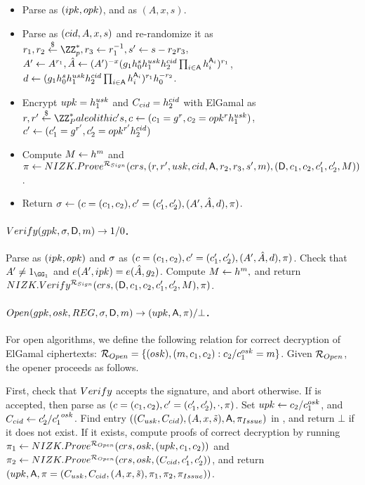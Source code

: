 \begin{itemize}
\item Parse \gpk as $(ipk,opk)$, and \cred as $(A,x,s)$.
\item Parse \cred as $(cid,A,x,s)$ and re-randomize it as $r_1,r_2 \getr
  \ZZ^*_p, r_3 \gets r_1^{-1}, s' \gets s - r_2r_3$, $A' \gets A^{r_1},
  \hat{A} \gets (A')^{-x}(g_1h_0^sh_1^{usk}h_2^{cid}
  \prod_{i \in \mathsf{A}}h_i^{\mathsf{A}_i})^{r_1}$,
  $d \gets (g_1h_0^sh_1^{usk}h_2^{cid}
  \prod_{i \in \mathsf{A}}h_i^{\mathsf{A}_i})^{r_1}h_0^{-r_2}$.
\item Encrypt $upk=h_1^{usk}$ and $C_{cid}=h_2^{cid}$
  with ElGamal as $r,r' \getr \ZZ^*_Paleolithic's,
  c \gets (c_1 = \gen{g}^r,c_2 = \opk^r\gen{h}_1^{\usk})$,
  $c' \gets (c'_1 = g^{r'},c'_2 = opk^{r'}h_2^{cid})$
\item Compute $M \gets h^m$ and
  $\pi \gets NIZK.Prove^{\mathcal{R}_{Sign}}(crs,
  (r,r',usk,cid,\mathsf{A},r_2,r_3,s',m), (\mathsf{D},c_1,c_2,c'_1,c'_2,M))$.
\item Return $\sigma \gets (c=(c_1,c_2),c'=(c'_1,c'_2),(A',\hat{A},d),\pi)$.
\end{itemize}

\paragraph{$Verify(gpk,\sigma,\mathsf{D},m) \rightarrow 1/0$.} %
Parse \gpk as $(ipk,opk)$ and $\sigma$ as $(c=(c_1,c_2),c'=(c'_1,c'_2),
(A',\hat{A},d), \pi)$. Check that $A' \neq 1_{\GG_1}$ and $e(A',ipk) =
e(\hat{A},g_2)$. Compute $M \gets h^m,$ and return
$NIZK.Verify^{\mathcal{R}_{Sign}}(crs,(\mathsf{D},c_1,c_2,c'_1,c'_2,M),
\pi)$.

\paragraph{$\Open(\gpk,\osk,\trans,\sig,\DAttrs,\msg)
  \rightarrow (\upk,\Attrs,\oproof)/\bot$.} %
For open algorithms, we define the following relation for correct decryption of
ElGamal ciphertexts: $\mathcal{R}_{Open} = \lbrace (osk),(m,c_1,c_2):
c_2/c_1^{osk} = m \rbrace$. Given $\mathcal{R}_{Open}$, the opener proceeds as
follows.

First, check that $Verify$ accepts the signature, and abort otherwise. If \sig
is accepted, then parse \sig as $(c=(c_1,c_2),c'=(c'_1,c'_2),\cdot,\pi)$.
Set $upk \gets c_2/c_1^{osk}$, and $C_{cid} \gets c'_2/{c'_1}^{osk}$. Find
entry $((C_{usk},C_{cid}),(A,x,\tilde{s}),\mathsf{A},\pi_{Issue})$ in \trans,
and return $\bot$ if it does not exist. If it exists, compute proofs of correct
decryption
by running $\pi_1 \gets NIZK.Prove^{\mathcal{R}_{Open}}(crs,osk,
(upk,c_1,c_2))$ and $\pi_2 \gets NIZK.Prove^{\mathcal{R}_{Open}}(crs,
osk,(C_{cid},c'_1,c'_2))$, and return $(upk,\mathsf{A},\pi = (C_{usk},
C_{cid},(A,x,\tilde{s}),\pi_1,\pi_2,\pi_{Issue}))$.

